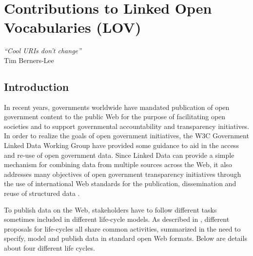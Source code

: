 \chapter{Contributions to Linked Open Vocabularies (LOV)}
\label{ch:ch6}

\begin{flushright}
\textit{``Cool URIs don't change''} \\
 Tim Berners-Lee
 \end{flushright}

\section*{Introduction}
In recent years, governments worldwide have mandated publication of open government content to the public Web for the purpose of facilitating open societies and to support governmental accountability and transparency initiatives. In order to realize the goals of open government initiatives, the W3C Government Linked Data Working Group have provided some guidance to aid in the access and re-use of open government data. Since Linked Data can provide a simple mechanism for combining data from multiple sources across the Web, it also addresses many objectives of open government transparency initiatives through the use of international Web standards for the publication, dissemination and reuse of structured data \cite{bpgld}.

To publish data on the Web, stakeholders have to follow different tasks sometimes included in different life-cycle models. As described in \cite{bpgld}, different proposals for life-cycles all share common activities, summarized in the need to specify, model and publish data in standard open Web formats. Below are details about four different life cycles.

